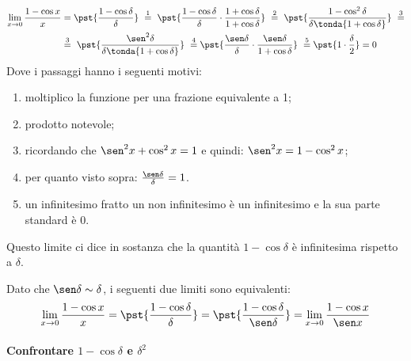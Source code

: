 \begin{align*}
 \lim_{x \rightarrow 0} \frac{1-\cos x}{x} &=
 \pst{\frac{1-\cos \delta}{\delta}}
~ \stackrel{1}{=} ~  
 \pst{\frac{1-\cos \delta}{\delta} \cdot 
      \frac{1+\cos \delta}{1+\cos \delta}}
~ \stackrel{2}{=} ~ 
 \pst{\frac{1-\cos^2 \delta}{\delta \tonda{1+\cos \delta}}}~ 
\stackrel{3}{=} \\
& \stackrel{3}{=} ~
 \pst{\frac{\sen^2 \delta}{\delta \tonda{1+\cos \delta}}}
~ \stackrel{4}{=}
 \pst{\frac{\sen \delta}{\delta} \cdot 
      \frac{\sen \delta}{1+\cos \delta}}
~ \stackrel{5}{=}
 \pst{1 \cdot \frac{\delta}{2}} = 0
\end{align*}
Dove i passaggi hanno i seguenti motivi:
\begin{enumerate} [nosep]
 \item moltiplico la funzione per una frazione equivalente a 1;
 \item prodotto notevole;
 \item ricordando che \(\sen^2 x + \cos^2 x = 1\) e quindi: 
 \(\sen^2 x = 1 - \cos^2 x\);
 \item per quanto visto sopra: \(\frac{\sen \delta}{\delta} = 1\).
 \item un infinitesimo fratto un non infinitesimo è un infinitesimo 
e la sua parte standard è 0.
\end{enumerate}
Questo limite ci dice in sostanza che la quantità \(1- \cos \delta\) è 
infinitesima rispetto a \(\delta\).
\begin{osservazione}
Dato che \(\sen \delta \sim \delta\), i seguenti due limiti sono 
equivalenti:
\[\lim_{x \rightarrow 0} \frac{1-\cos x}{x} =
 \pst{\frac{1-\cos \delta}{\delta}} =
 \pst{\frac{1-\cos \delta}{\sen \delta}} =
 \lim_{x \rightarrow 0} \frac{1-\cos x}{\sen x}\]
\end{osservazione}

\paragraph{Confrontare \(1-\cos\delta\) e \(\delta^2\)}~
\label{senoverso2}

